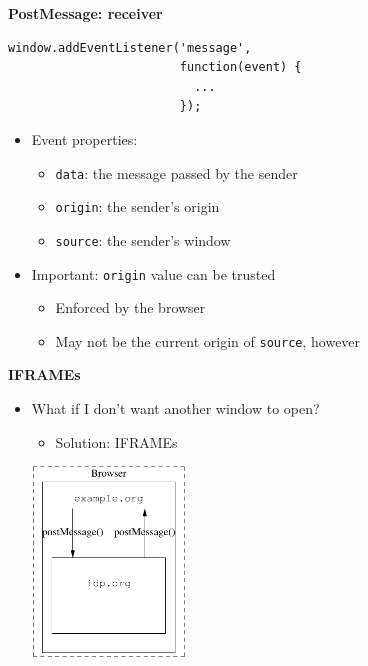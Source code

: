 \documentclass[helvetica]{seminar}
\newcommand{\heading}[1]{%
  \begin{center} 
    \large\bf 
    #1 
  \end{center} 
  \vspace{.4 in}}
\begin{document}
\begin{slide}
\heading{PostMessage: receiver}

\begin{verbatim}
window.addEventListener('message',
                        function(event) {
                          ...
                        });
\end{verbatim}

\begin{itemize}
\item Event properties:
  \begin{itemize}
  \item[] \verb^data^: the message passed by the sender
  \item[] \verb^origin^: the sender's origin
  \item[] \verb^source^: the sender's window
  \end{itemize}

\item Important: \verb^origin^ value can be trusted
  \begin{itemize}
  \item Enforced by the browser
  \item May not be the current origin of \verb^source^, however
  \end{itemize}
\end{itemize}
\end{slide}


\begin{slide}
\heading{IFRAMEs}

\begin{itemize}
\item What if I don't want another window to open?
  \begin{itemize}
  \item Solution: IFRAMEs
  \end{itemize}

  \begin{center}
  \includegraphics[height=2in]{iframe}
  \end{center}

\end{itemize}
\end{slide}
\end{document}
